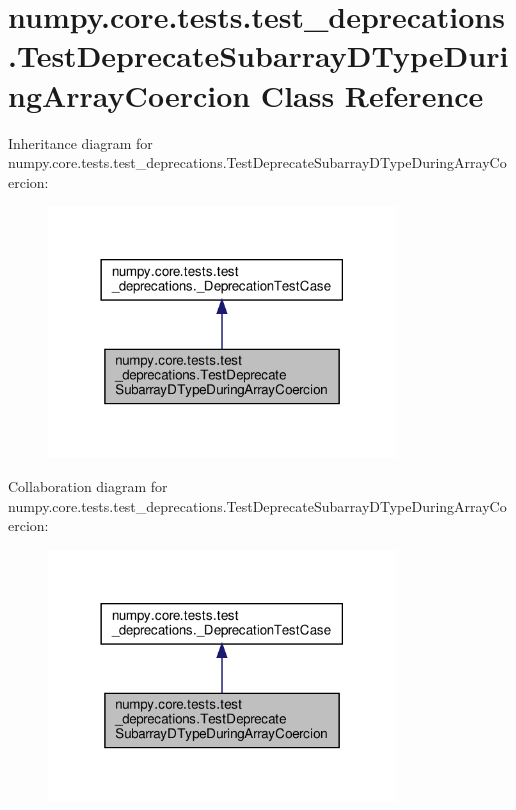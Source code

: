 \hypertarget{classnumpy_1_1core_1_1tests_1_1test__deprecations_1_1TestDeprecateSubarrayDTypeDuringArrayCoercion}{}\section{numpy.\+core.\+tests.\+test\+\_\+deprecations.\+Test\+Deprecate\+Subarray\+D\+Type\+During\+Array\+Coercion Class Reference}
\label{classnumpy_1_1core_1_1tests_1_1test__deprecations_1_1TestDeprecateSubarrayDTypeDuringArrayCoercion}


Inheritance diagram for numpy.\+core.\+tests.\+test\+\_\+deprecations.\+Test\+Deprecate\+Subarray\+D\+Type\+During\+Array\+Coercion\+:
\nopagebreak
\begin{figure}[H]
\begin{center}
\leavevmode
\includegraphics[width=261pt]{classnumpy_1_1core_1_1tests_1_1test__deprecations_1_1TestDeprecateSubarrayDTypeDuringArrayCoercion__inherit__graph}
\end{center}
\end{figure}


Collaboration diagram for numpy.\+core.\+tests.\+test\+\_\+deprecations.\+Test\+Deprecate\+Subarray\+D\+Type\+During\+Array\+Coercion\+:
\nopagebreak
\begin{figure}[H]
\begin{center}
\leavevmode
\includegraphics[width=261pt]{classnumpy_1_1core_1_1tests_1_1test__deprecations_1_1TestDeprecateSubarrayDTypeDuringArrayCoercion__coll__graph}
\end{center}
\end{figure}
